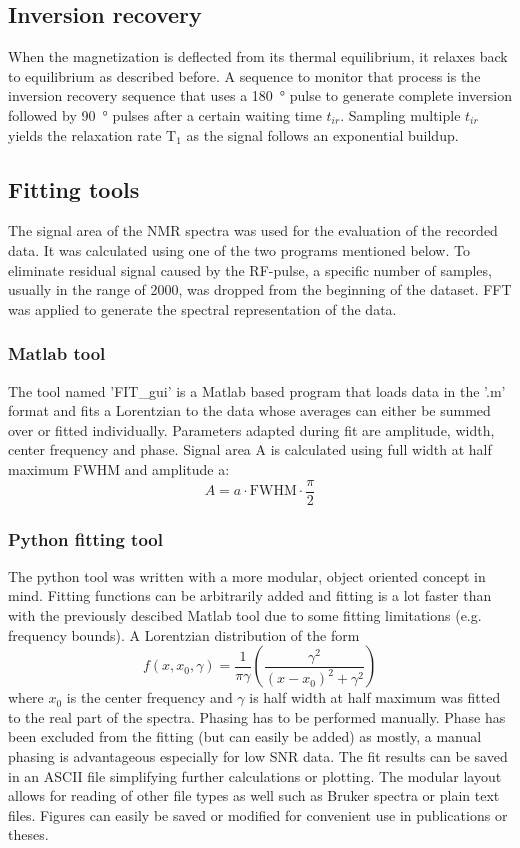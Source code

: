         \subsection{Inversion recovery}
            When the magnetization is deflected from its thermal equilibrium, it relaxes back to equilibrium as described before. A sequence to monitor that process is the inversion recovery sequence that uses a \SI{180}{\degree} pulse to generate complete inversion followed by \SI{90}{\degree} pulses after a certain waiting time $t_{ir}$. Sampling multiple $t_{ir}$ yields the relaxation rate T$_1$ as the signal follows an exponential buildup.
        \subsection{Fitting tools}
            The signal area of the NMR spectra was used for the evaluation of the recorded data. It was calculated using one of the two programs mentioned below. To eliminate residual signal caused by the RF-pulse, a specific number of samples, usually in the range of 2000, was dropped from the beginning of the dataset. FFT was applied to generate the spectral representation of the data.
            \subsubsection{Matlab tool}
            The tool named 'FIT\_gui' is a Matlab based program that loads data in the '.m' format and fits a Lorentzian to the data whose averages can either be summed over or fitted individually. Parameters adapted during fit are amplitude, width, center frequency and phase. Signal area A is calculated using full width at half maximum FWHM and amplitude a:
            \begin{equation}
                A=a\cdot\mathrm{FWHM}\cdot\frac{\pi}{2}
            \end{equation}
            \subsubsection{Python fitting tool}
            The python tool was written with a more modular, object oriented concept in mind. Fitting functions can be arbitrarily added and fitting is a lot faster than with the previously descibed Matlab tool due to some fitting limitations (e.g. frequency bounds). A Lorentzian distribution of the form
            \begin{equation}
                f(x,x_0, \gamma) = \frac{1}{\pi\gamma}\left(\frac{\gamma^2}{(x-x_0)^2+\gamma^2}\right)
            \end{equation}
            where $x_0$ is the center frequency and $\gamma$ is half width at half maximum was fitted to the real part of the spectra. Phasing has to be performed manually.
            Phase has been excluded from the fitting (but can easily be added) as mostly, a manual phasing is advantageous especially for low SNR data. The fit results can be saved in an ASCII file simplifying further calculations or plotting.
            The modular layout allows for reading of other file types as well such as Bruker spectra or plain text files.
            Figures can easily be saved or modified for convenient use in publications or theses.
